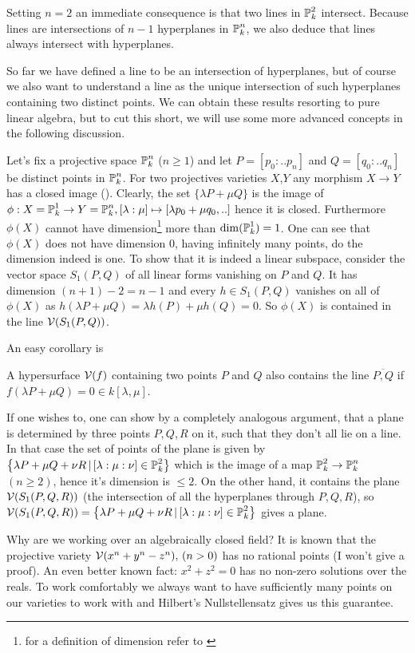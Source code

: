 \begin{corollary} \label{corollarySimpleIntersect}
Setting $n=2$ an immediate consequence is that two lines in $\operatorname{\mathbb P}^2_k$ intersect.
Because lines are intersections of $n-1$ hyperplanes in $\operatorname{\mathbb P}^n_k$, we also deduce that lines always intersect with hyperplanes.
\end{corollary}

So far we have defined a line to be an intersection of hyperplanes, but of course we also want to understand a line as the unique intersection of such hyperplanes containing two distinct points.
We can obtain these results resorting to pure linear algebra, but to cut this short, we will use some more advanced concepts in the following discussion.

Let's fix a projective space $\operatorname{\mathbb P}^n_k$ ($n\geq 1$) and let $P=[p_0:..p_n]$ and $Q=[q_0:..q_n]$ be distinct points in $\operatorname{\mathbb P}^n_k$.
For two projectives varieties $X$,$Y$ any morphism $X \to Y$ has a closed image (\cite[theorem 1.10]{shafarevich1994basic}).
Clearly, the set $\{ \lambda P + \mu Q \}$ is the image of $\phi : X=\operatorname{\mathbb P}^1_k \to Y=\operatorname{\mathbb P}^n_k, [\lambda:\mu] \mapsto [\lambda p_0 + \mu q_0,..]$ hence it is closed.
Furthermore $\phi(X)$ cannot have dimension\footnote{for a definition of dimension refer to \cite[chapter 6]{shafarevich1994basic}} more than $\dim(\operatorname{\mathbb P}^1_k) = 1$.
One can see that $\phi(X)$ does not have dimension 0, having infinitely many points, do the dimension indeed is one.
To show that it is indeed a linear subspace, consider the vector space $S_1(P,Q)$ of all linear forms vanishing on $P$ and $Q$.
It has dimension $(n+1) - 2 = n-1$ and every $h \in S_1(P,Q)$ vanishes on all of $\phi(X)$ as $h(\lambda P + \mu Q) = \lambda h(P) + \mu h(Q) = 0$.
So $\phi(X)$ is contained in the line $\operatorname{\mathcal V}(S_1(P,Q))$.

An easy corollary is
\begin{lemma} \label{lemmaLineOnSurface}
A hypersurface $\operatorname{\mathcal V}(f)$ containing two points $P$ and $Q$ also contains the line $\overline{P,Q}$ if $f(\lambda P +\mu Q) = 0 \in k[\lambda,\mu]$.
\end{lemma}

If one wishes to, one can show by a completely analogous argument, that a plane is determined by three points $P,Q,R$ on it, such that they don't all lie on a line.
In that case the set of points of the plane is given by $\left\lbrace\lambda P + \mu Q + \nu R\,|\, [\lambda:\mu:\nu] \in \operatorname{\mathbb P}^2_k\right\rbrace$ which is the image of a map $\operatorname{\mathbb P}^2_k \to \operatorname{\mathbb P}^n_k$ $(n\geq 2)$, hence it's dimension is $\leq 2$.
On the other hand, it contains the plane $\operatorname{\mathcal V}(S_1(P,Q,R))$ (the intersection of all the hyperplanes through $P,Q,R$), so $\operatorname{\mathcal V}(S_1(P,Q,R)) = \left\lbrace\lambda P + \mu Q + \nu R\,|\, [\lambda:\mu:\nu] \in \operatorname{\mathbb P}^2_k\right\rbrace$ gives a plane.

\begin{remark}
Why are we working over an algebraically closed field?
It is known that the projective variety $\operatorname{\mathcal V}(x^n + y^n - z^n), \,(n>0)$ has no rational points (I won't give a proof).
An even better known fact: $x^2 + z^2 = 0$ has no non-zero solutions over the reals.
To work comfortably we always want to have sufficiently many points on our varieties to work with and Hilbert's Nullstellensatz gives us this guarantee.
\end{remark}

